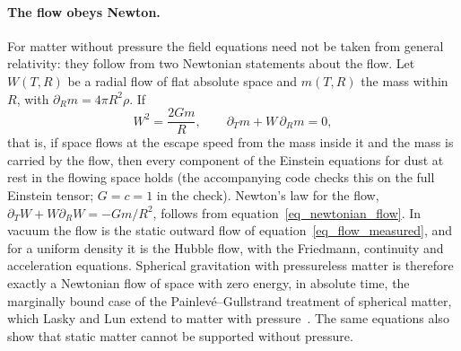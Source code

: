 \documentclass{iopjournal}
\begin{document}
\paragraph{The flow obeys Newton.} For matter without pressure the field equations need not be taken from general relativity: they follow from two Newtonian statements about the flow. Let $W(T,R)$ be a radial flow of flat absolute space and $m(T,R)$ the mass within $R$, with $\partial_Rm=4\pi R^2\rho$. If
\begin{equation}\label{eq_newtonian_flow}
    W^2=\frac{2Gm}{R},
    \qquad
    \partial_Tm+W\,\partial_Rm=0,
\end{equation}
that is, if space flows at the escape speed from the mass inside it and the mass is carried by the flow, then every component of the Einstein equations for dust at rest in the flowing space holds (the accompanying code checks this on the full Einstein tensor; $G=c=1$ in the check). Newton's law for the flow, $\partial_TW+W\partial_RW=-Gm/R^2$, follows from equation~\eqref{eq_newtonian_flow}. In vacuum the flow is the static outward flow of equation~\eqref{eq_flow_measured}, and for a uniform density it is the Hubble flow, with the Friedmann, continuity and acceleration equations. Spherical gravitation with pressureless matter is therefore exactly a Newtonian flow of space with zero energy, in absolute time, the marginally bound case of the Painlev\'e--Gullstrand treatment of spherical matter, which Lasky and Lun extend to matter with pressure~\cite{LaskyLun2006}. The same equations also show that static matter cannot be supported without pressure.
\end{document}
